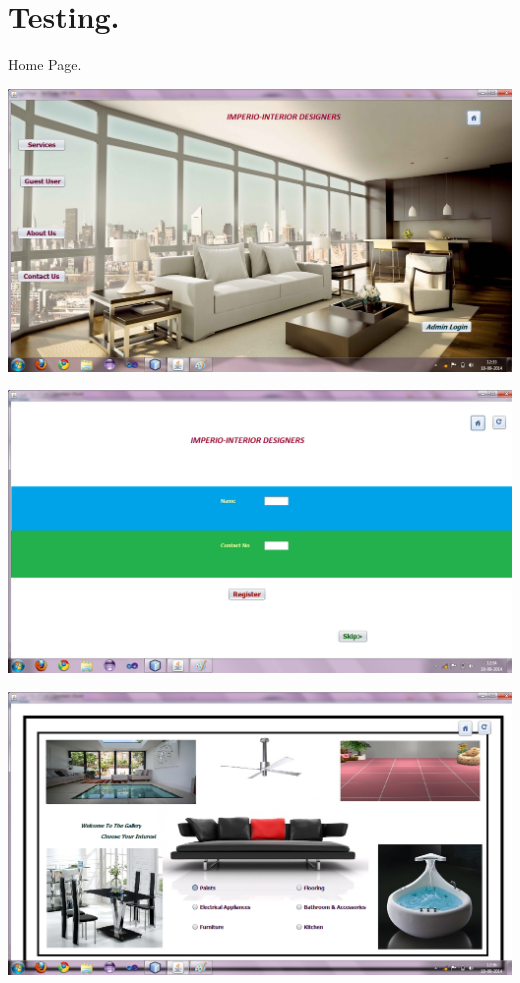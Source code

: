 \documentclass[12pt,a4paper]{report}
\begin{document}
\chapter{Testing.}%
Home Page.
\begin{center}
\includegraphics[scale=0.45]{1.png}
\end{center}
\begin{center}
\includegraphics[scale=0.45]{2.png}
\end{center}
\begin{center}
\includegraphics[scale=0.45]{3.png}
\end{center}
\end{document}
